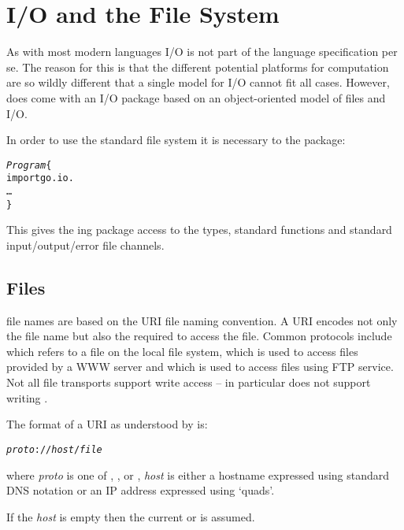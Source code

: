 \chapter{I/O and the File System}
\label{io}

As with most modern languages I/O is not part of the language specification per se. The reason for this is that the different potential platforms for computation are so wildly different that a single model for I/O cannot fit all cases. However, \go does come with an I/O package based on an object-oriented model of files and I/O.

In order to use the standard file system it is necessary to  the  package:
\begin{alltt}
\emph{Program}\{
  import go.io.
  \ldots
\}
\end{alltt}
This gives the ing package access to the types, standard functions and standard input/output/error file channels.

\section{Files}
\label{io:url}
\go file names are based on the URI file naming convention. A URI encodes not only the file name but also the  required to access the file. Common protocols include  which refers to a file on the local file system,  which is used to access files provided by a WWW server and  which is used to access files using FTP service. Not all file transports support write access -- in particular  does not support writing .

The format of a URI as understood by \go is:
\begin{alltt}
\emph{proto}://\emph{host}/\emph{file}
\end{alltt}
where \emph{proto} is one of , ,  or , \emph{host} is either a hostname expressed using standard DNS notation or an IP address expressed using `quads'.

If the \emph{host} is empty then the current or  is assumed.

